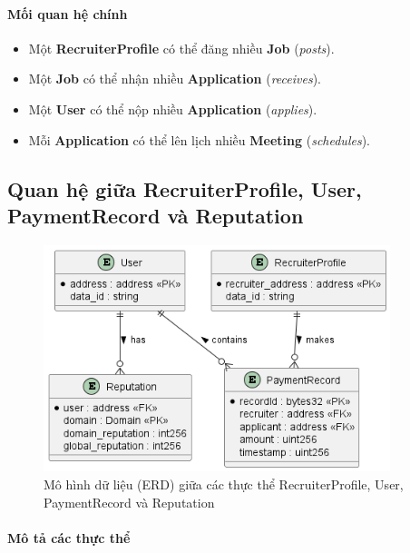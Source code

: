   \paragraph{Mối quan hệ chính}
    \begin{itemize} 
      \item Một \textbf{RecruiterProfile} có thể đăng nhiều \textbf{Job} (\emph{posts}).
      \item Một \textbf{Job} có thể nhận nhiều \textbf{Application} (\emph{receives}).
      \item Một \textbf{User} có thể nộp nhiều \textbf{Application} (\emph{applies}).
      \item Mỗi \textbf{Application} có thể lên lịch nhiều \textbf{Meeting} (\emph{schedules}).
    \end{itemize}


\subsection{Quan hệ giữa RecruiterProfile, User, PaymentRecord và Reputation}

  \begin{figure}[H]
    \centering
    \includegraphics[width=0.9\textwidth]{../images/ERD-sub4.png}
    \caption{Mô hình dữ liệu (ERD) giữa các thực thể RecruiterProfile, User, PaymentRecord và Reputation}
    \label{fig:erd-sub4}
  \end{figure}

  \paragraph{Mô tả các thực thể}

